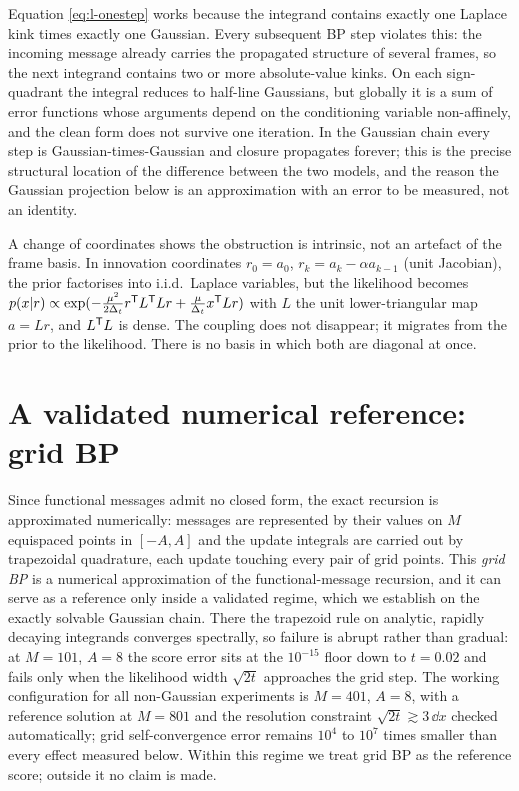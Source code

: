 \begin{remark}\label{rmk:l-breakdown}
Equation \eqref{eq:l-onestep} works because the integrand contains
exactly one Laplace kink times exactly one Gaussian. Every subsequent BP
step violates this: the incoming message already carries the propagated
structure of several frames, so the next integrand contains two or more
absolute-value kinks. On each sign-quadrant the integral reduces to
half-line Gaussians, but globally it is a sum of error functions whose
arguments depend on the conditioning variable non-affinely, and the clean
form does not survive one iteration. In the Gaussian chain every step is
Gaussian-times-Gaussian and closure propagates forever; this is the
precise structural location of the difference between the two models, and
the reason the Gaussian projection below is an approximation with an
error to be measured, not an identity.
\end{remark}

A change of coordinates shows the obstruction is intrinsic, not an
artefact of the frame basis. In innovation coordinates $r_0 = a_0$,
$r_k = a_k - \alpha a_{k-1}$ (unit Jacobian), the prior factorises into
i.i.d.\ Laplace variables, but the likelihood becomes
$p(x|r) \propto \exp(-\tfrac{\mu^2}{2\Delta_t} r^{\mathsf{T}} L^{\mathsf{T}} L r
+ \tfrac{\mu}{\Delta_t} x^{\mathsf{T}} L r)$ with $L$ the unit lower-triangular
map $a = Lr$, and $L^{\mathsf{T}} L$ is dense. The coupling does not disappear; it
migrates from the prior to the likelihood. There is no basis in which
both are diagonal at once.

\section{A validated numerical reference: grid BP}\label{sec:l-grid}

Since functional messages admit no closed form, the exact recursion is
approximated numerically: messages are represented by their values on $M$
equispaced points in $[-A, A]$ and the update integrals are carried out
by trapezoidal quadrature, each update touching every pair of grid
points. This
\emph{grid BP} is a numerical approximation of the functional-message
recursion, and it can serve as a reference only inside a validated
regime, which we establish on the exactly solvable Gaussian chain. There
the trapezoid rule on analytic, rapidly decaying integrands converges
spectrally, so failure is abrupt rather than gradual: at $M = 101$,
$A = 8$ the score error sits at the $10^{-15}$ floor down to $t = 0.02$
and fails only when the likelihood width $\sqrt{2t}$ approaches the grid
step. The working configuration for all non-Gaussian experiments is
$M = 401$, $A = 8$, with a reference solution at $M = 801$ and the
resolution constraint $\sqrt{2t} \gtrsim 3\,\dd x$ checked automatically;
grid self-convergence error remains $10^4$ to $10^7$ times smaller than
every effect measured below. Within this regime we treat grid BP as the
reference score; outside it no claim is made.

